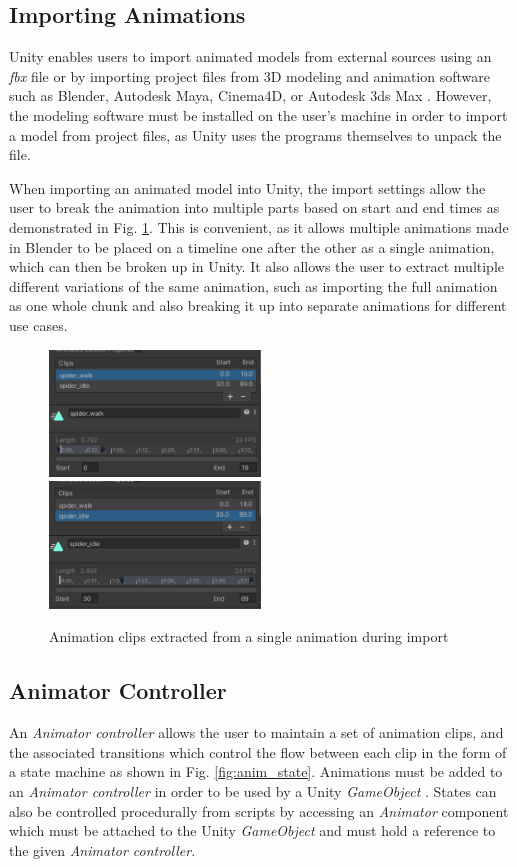 \subsection{Importing Animations}
Unity enables users to import animated models from external sources using an
\textit{fbx} file or by importing project files from 3D modeling and animation
software such as Blender, Autodesk Maya, Cinema4D, or Autodesk 3ds Max
\cite{unity_import}. However, the modeling software must be installed on the
user's machine in order to import a model from project files, as Unity uses the
programs themselves to unpack the file. 

When importing an animated model into Unity, the import settings allow the user
to break the animation into multiple parts based on start and end times as
demonstrated in Fig. \ref{fig:anim_chunk}. This is convenient, as it allows
multiple animations made in Blender to be placed on a timeline one after the
other as a single animation, which can then be broken up in Unity. It also
allows the user to extract multiple different variations of the same animation,
such as importing the full animation as one whole chunk and also breaking it up
into separate animations for different use cases.

\begin{figure}
    \includegraphics[width=0.5\textwidth]{grafika/animation_chunk_1.eps}
    \includegraphics[width=0.5\textwidth]{grafika/animation_chunk_2.eps}
    \caption{Animation clips extracted from a single animation during import}
    \label{fig:anim_chunk}
\end{figure}

\subsection{Animator Controller}
An \textit{Animator controller} allows the user to maintain a set of animation
clips, and the associated transitions which control the flow between each clip
in the form of a state machine as shown in Fig. \ref{fig:anim_state}. Animations must be
added to an \textit{Animator controller} in order to be used by a Unity
\textit{GameObject} \cite{unity_animator}. States can also be controlled
procedurally from scripts by accessing an \textit{Animator} component which must
be attached to the Unity \textit{GameObject} and must hold a reference to the
given \textit{Animator controller}.
 
